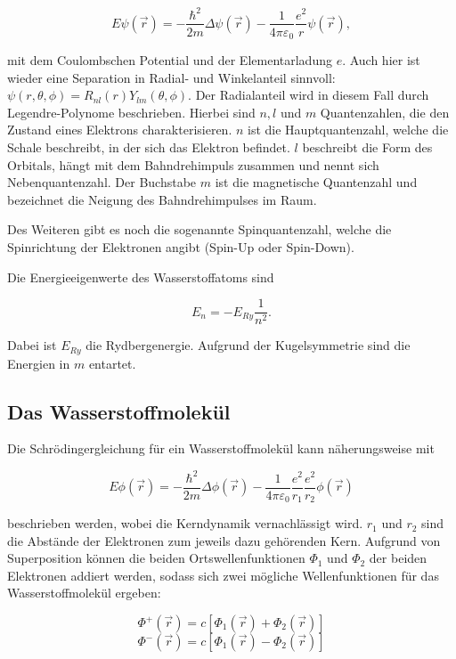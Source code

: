 \begin{equation}
  E\psi(\vec{r})=-\frac{\hbar^2}{2m}\Delta\psi(\vec{r})-\frac{1}{4\pi\varepsilon_0}\frac{e^2}{r}\psi(\vec{r}) ,
\end{equation}

mit dem Coulombschen Potential und der Elementarladung $e$. Auch hier ist wieder eine Separation
in Radial- und Winkelanteil sinnvoll: $\psi(r,\theta,\phi) = R_{nl}(r) Y_{lm}(\theta,\phi)$.
Der Radialanteil wird in diesem Fall durch Legendre-Polynome beschrieben.
Hierbei sind $n, l$ und $m$ Quantenzahlen, die den Zustand eines Elektrons charakterisieren. $n$ ist die Hauptquantenzahl, welche
die Schale beschreibt, in der sich das Elektron befindet. $l$ beschreibt die Form des Orbitals, hängt mit dem Bahndrehimpuls
zusammen und nennt sich Nebenquantenzahl. Der Buchstabe $m$ ist die magnetische Quantenzahl und bezeichnet die Neigung des
Bahndrehimpulses im Raum.

Des Weiteren gibt es noch die sogenannte Spinquantenzahl, welche die Spinrichtung der Elektronen angibt (Spin-Up oder Spin-Down).

Die Energieeigenwerte des Wasserstoffatoms sind

\begin{equation}
  E_n = -E_{Ry} \frac{1}{n^2} .
\end{equation}

Dabei ist $E_{Ry}$ die Rydbergenergie. Aufgrund der Kugelsymmetrie sind die Energien in $m$ entartet.

\subsection{Das Wasserstoffmolekül}

Die Schrödingergleichung für ein Wasserstoffmolekül kann näherungsweise mit

\begin{equation}
  E\phi(\vec{r})=-\frac{\hbar^2}{2m}\Delta\phi(\vec{r})-\frac{1}{4\pi\varepsilon_0}\frac{e^2}{r_1}\frac{e^2}{r_2}\phi(\vec{r})
\end{equation}

beschrieben werden, wobei die Kerndynamik vernachlässigt wird. $r_1$ und $r_2$ sind die Abstände der Elektronen zum jeweils dazu
gehörenden Kern.
Aufgrund von Superposition können die beiden Ortswellenfunktionen $\Phi_1$ und $\Phi_2$ der beiden Elektronen addiert werden,
sodass sich zwei mögliche Wellenfunktionen für das Wasserstoffmolekül ergeben:

\begin{equation}
  \Phi^+(\vec{r}) = c[\Phi_1(\vec{r})+\Phi_2(\vec{r})]
\end{equation}
\begin{equation}
  \Phi^-(\vec{r}) = c[\Phi_1(\vec{r})-\Phi_2(\vec{r})]
\end{equation}

